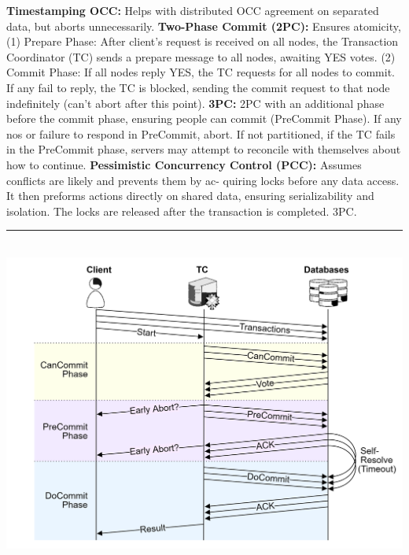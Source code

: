 \begin{multicols}{2}
\textbf{Timestamping OCC:} Helps with distributed OCC agreement on separated data, but aborts unnecessarily.
\textbf{Two-Phase Commit (2PC):} Ensures atomicity, (1) Prepare Phase: After client's request is received on all nodes, the Transaction Coordinator (TC) sends a prepare message to all nodes, awaiting YES votes. 
(2) Commit Phase: If all nodes reply YES, the TC requests for all nodes to commit. If any fail to reply, the TC is blocked, sending the commit request to that node indefinitely (can't abort after this point).
\textbf{3PC:} 2PC with an additional phase before the commit phase, ensuring people can commit (PreCommit Phase). If any nos or failure to respond in PreCommit, abort. If not 
partitioned, if the TC fails in the PreCommit phase, servers may attempt to reconcile with themselves about how to continue.
\textbf{Pessimistic Concurrency Control (PCC):} Assumes conflicts are likely and prevents them by ac-
quiring locks before any data access. It then preforms actions directly on shared data, ensuring
serializability and isolation. The locks are released after the transaction is completed. 3PC.

\noindent
\rule{\linewidth}{0.4pt}\\

\hspace{-1.5em}
\includegraphics[width=\linewidth]{Sections/trans/3PC.png}\\

\end{multicols}